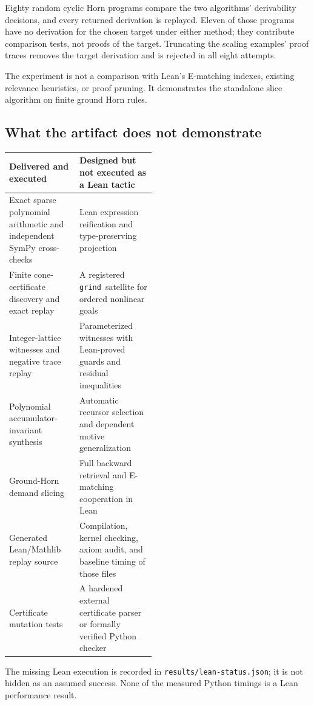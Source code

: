 \documentclass[11pt,a4paper]{article}
\newcommand{\grind}{\texttt{grind}}
\newcommand{\codepath}[1]{\nolinkurl{#1}}
\begin{document}
Eighty random cyclic Horn programs compare the two algorithms' derivability decisions, and every returned derivation is replayed. Eleven of those programs have no derivation for the chosen target under either method; they contribute comparison tests, not proofs of the target. Truncating the scaling examples' proof traces removes the target derivation and is rejected in all eight attempts.

The experiment is not a comparison with Lean's E-matching indexes, existing relevance heuristics, or proof pruning. It demonstrates the standalone slice algorithm on finite ground Horn rules.

\subsection{What the artifact does not demonstrate}

\begin{center}
\small
\begin{tabularx}{\linewidth}{@{}p{0.48\linewidth}Y@{}}
\toprule
Delivered and executed & Designed but not executed as a Lean tactic\\
\midrule
Exact sparse polynomial arithmetic and independent SymPy cross-checks & Lean expression reification and type-preserving projection\\
Finite cone-certificate discovery and exact replay & A registered \grind\ satellite for ordered nonlinear goals\\
Integer-lattice witnesses and negative trace replay & Parameterized witnesses with Lean-proved guards and residual inequalities\\
Polynomial accumulator-invariant synthesis & Automatic recursor selection and dependent motive generalization\\
Ground-Horn demand slicing & Full backward retrieval and E-matching cooperation in Lean\\
Generated Lean/Mathlib replay source & Compilation, kernel checking, axiom audit, and baseline timing of those files\\
Certificate mutation tests & A hardened external certificate parser or formally verified Python checker\\
\bottomrule
\end{tabularx}
\end{center}

The missing Lean execution is recorded in \codepath{results/lean-status.json}; it is not hidden as an assumed success. None of the measured Python timings is a Lean performance result.
\end{document}
